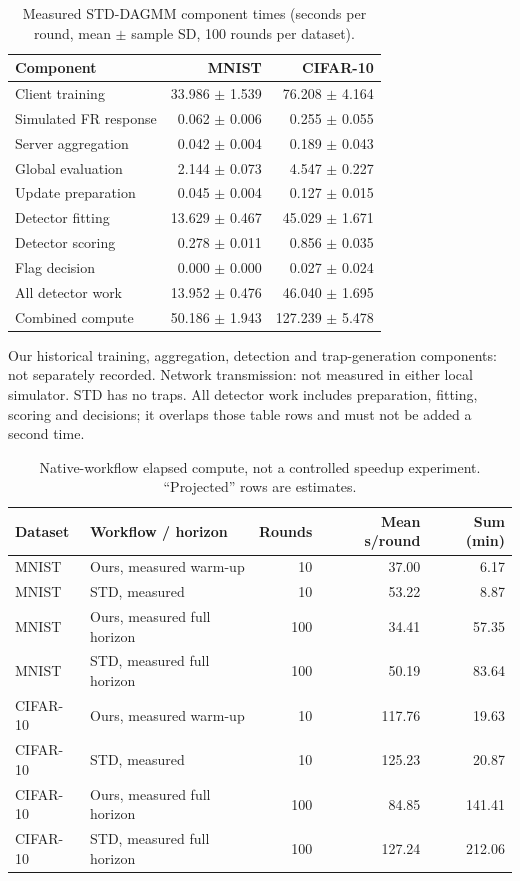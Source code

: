 \begin{table}[t]\centering\footnotesize
\caption{Measured STD-DAGMM component times (seconds per round, mean $\pm$ sample SD, 100 rounds per dataset).}\label{tab:std-segments}
\begin{tabular}{lrr}\toprule Component & MNIST & CIFAR-10 \\ \midrule
Client training & 33.986 $\pm$ 1.539 & 76.208 $\pm$ 4.164 \\
Simulated FR response & 0.062 $\pm$ 0.006 & 0.255 $\pm$ 0.055 \\
Server aggregation & 0.042 $\pm$ 0.004 & 0.189 $\pm$ 0.043 \\
Global evaluation & 2.144 $\pm$ 0.073 & 4.547 $\pm$ 0.227 \\
Update preparation & 0.045 $\pm$ 0.004 & 0.127 $\pm$ 0.015 \\
Detector fitting & 13.629 $\pm$ 0.467 & 45.029 $\pm$ 1.671 \\
Detector scoring & 0.278 $\pm$ 0.011 & 0.856 $\pm$ 0.035 \\
Flag decision & 0.000 $\pm$ 0.000 & 0.027 $\pm$ 0.024 \\
All detector work & 13.952 $\pm$ 0.476 & 46.040 $\pm$ 1.695 \\
Combined compute & 50.186 $\pm$ 1.943 & 127.239 $\pm$ 5.478 \\
\bottomrule\end{tabular}
\par\smallskip\begin{minipage}{0.96\textwidth}\scriptsize Our historical training, aggregation, detection and trap-generation components: not separately recorded. Network transmission: not measured in either local simulator. STD has no traps. All detector work includes preparation, fitting, scoring and decisions; it overlaps those table rows and must not be added a second time.\end{minipage}\end{table}
\begin{table}[t]\centering\footnotesize
\caption{Native-workflow elapsed compute, not a controlled speedup experiment. ``Projected'' rows are estimates.}\label{tab:timing-horizons}
\begin{tabular}{llrrr}\toprule Dataset & Workflow / horizon & Rounds & Mean s/round & Sum (min) \\ \midrule
MNIST & Ours, measured warm-up & 10 & 37.00 & 6.17 \\
MNIST & STD, measured & 10 & 53.22 & 8.87 \\
MNIST & Ours, measured full horizon & 100 & 34.41 & 57.35 \\
MNIST & STD, measured full horizon & 100 & 50.19 & 83.64 \\
CIFAR-10 & Ours, measured warm-up & 10 & 117.76 & 19.63 \\
CIFAR-10 & STD, measured & 10 & 125.23 & 20.87 \\
CIFAR-10 & Ours, measured full horizon & 100 & 84.85 & 141.41 \\
CIFAR-10 & STD, measured full horizon & 100 & 127.24 & 212.06 \\
\bottomrule\end{tabular}\end{table}
